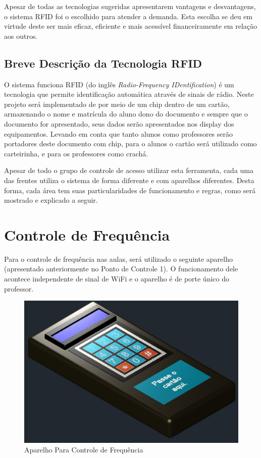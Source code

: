 Apesar de todas as tecnologias sugeridas apresentarem vantagens e desvantagens, o sistema RFID foi o escolhido para atender
a demanda. Esta escolha se deu em virtude deste ser mais eficaz, eficiente e mais acessível financeiramente em relação aos
outros.

\subsection{Breve Descrição da Tecnologia RFID}
O sistema funciona RFID (do inglês \textit{Radio-Frequency IDentification}) é um tecnologia que permite identificação automática
 através de sinais de rádio. Neste projeto será implementado de  por meio de um chip dentro de um cartão, armazenando o
 nome e matrícula do aluno dono do documento e sempre que o documento for apresentado, seus dados serão apresentados nos
 display dos equipamentos. Levando em conta que tanto alunos como professores serão portadores deste documento com chip,
 para o alunos o cartão será utilizado como carteirinha, e para os professores como crachá.

Apesar de todo o grupo de controle de acesso utilizar esta ferramenta, cada uma das frentes utiliza o sistema de forma
diferente e com aparelhos diferentes. Desta forma, cada área tem suas particularidades de funcionamento e regras, como será
 mostrado e explicado a seguir.

\section{Controle de Frequência}
Para o controle de frequência nas aulas, será utilizado o seguinte aparelho (apresentado anteriormente no Ponto de Controle 1).
O funcionamento dele acontece independente de sinal de WiFi e o aparelho é de porte único do professor.

\begin{figure}[!ht]
  \centering
  \includegraphics[keepaspectratio=true,scale=0.45]{figuras/freq.eps}
  \caption{Aparelho Para Controle de Frequência}
\end{figure}

